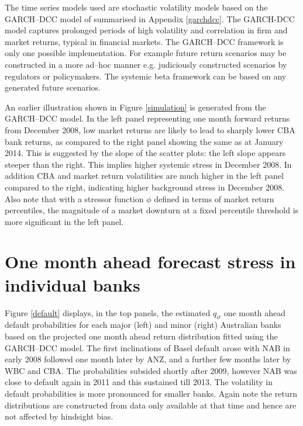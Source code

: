 \documentclass[12pt]{article}
\newcommand{\fref}[1]{Figure \ref{#1}}
\newcommand{\aref}[1]{Appendix \ref{#1}}
\begin{document}
The time series models used are stochastic volatility models based on the GARCH--DCC model of \cite{engle2002dynamic} summarised in \aref{garchdcc}. The GARCH-DCC model captures prolonged periods of high volatility and correlation in firm and market returns, typical in financial markets. The GARCH--DCC framework is only one possible implementation.   For example future return scenarios may be constructed in a more ad--hoc manner e.g. judiciously constructed scenarios by regulators or policymakers.   The  systemic beta framework can be based on  any  generated  future  scenarios.

An earlier illustration shown in \fref{simulation} is generated from the GARCH--DCC model.  In the left panel representing one month forward returns from December 2008, low market returns are likely to lead to sharply lower CBA bank returns, as compared to the right panel showing the same as at January 2014.   This is suggested by the slope of the scatter plots:  the left slope appears steeper than the right. This implies higher systemic stress in December 2008. In addition CBA and market return volatilities are much higher in the left panel compared to the right, indicating higher background stress in December 2008. Also note that with a stressor function $\phi$ defined in terms of market return percentiles, the magnitude of a market downturn at a fixed percentile threshold is more significant in the left panel.

\section{One month ahead forecast stress in individual banks}\label{simulate1}

\fref{default} displays, in the top panels, the estimated $q_{it}$ one month ahead default probabilities for each major (left) and minor (right) Australian banks based on the projected one month ahead return distribution fitted using the GARCH--DCC model.  The first inclinations of Basel default arose with NAB in early 2008 followed one month later by ANZ, and  a further few months later by WBC and CBA. The probabilities subsided shortly after 2009, however NAB was close to default again in 2011 and this sustained till 2013. The volatility in default probabilities is more pronounced for smaller banks. Again note the return distributions are constructed from data only available at that time and hence are not affected by hindsight bias.
\end{document}
